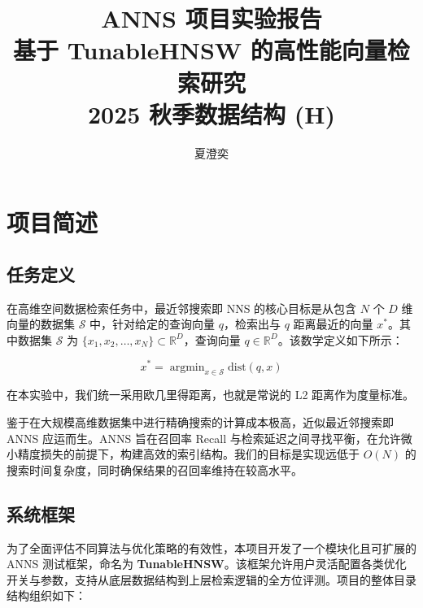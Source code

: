 \documentclass{article}
\title{\textbf{ANNS 项目实验报告}\\基于 TunableHNSW 的高性能向量检索研究\\\large 2025 秋季数据结构 (H)}
\author{夏澄奕}
\date{}
\begin{document}
\maketitle

\tableofcontents

\newpage

\section{项目简述}

\subsection{任务定义}

在高维空间数据检索任务中，最近邻搜索即 NNS 的核心目标是从包含 $N$ 个 $D$ 维向量的数据集 $\mathcal{S}$ 中，针对给定的查询向量 $q$，检索出与 $q$ 距离最近的向量 $x^*$。其中数据集 $\mathcal{S}$ 为 $\{x_1, x_2, \dots, x_N\} \subset \mathbb{R}^D$，查询向量 $q \in \mathbb{R}^D$。该数学定义如下所示：

\begin{equation}
    x^* = \mathop{\arg\min}_{x \in \mathcal{S}} \text{dist}(q, x)
\end{equation}

在本实验中，我们统一采用欧几里得距离，也就是常说的 L2 距离作为度量标准。

鉴于在大规模高维数据集中进行精确搜索的计算成本极高，近似最近邻搜索即 ANNS 应运而生。ANNS 旨在召回率 Recall 与检索延迟之间寻找平衡，在允许微小精度损失的前提下，构建高效的索引结构。我们的目标是实现远低于 $O(N)$ 的搜索时间复杂度，同时确保结果的召回率维持在较高水平。

\subsection{系统框架}

为了全面评估不同算法与优化策略的有效性，本项目开发了一个模块化且可扩展的 ANNS 测试框架，命名为 \textbf{TunableHNSW}。该框架允许用户灵活配置各类优化开关与参数，支持从底层数据结构到上层检索逻辑的全方位评测。项目的整体目录结构组织如下：
\end{document}
